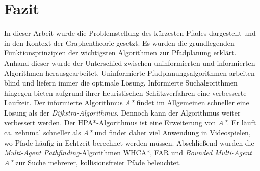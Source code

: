 \chapter{Fazit}

In dieser Arbeit wurde die Problemstellung des kürzesten Pfades dargestellt und in den Kontext der Graphentheorie gesetzt. Es wurden die grundlegenden Funktionsprinzipien der wichtigsten Algorithmen zur Pfadplanung erklärt. Anhand dieser wurde der Unterschied zwischen uninformierten und informierten Algorithmen herausgearbeitet. Uninformierte Pfadplanungsalgorithmen arbeiten blind und liefern immer die optimale Lösung. Informierte Suchalgorithmen hingegen bieten aufgrund ihrer heuristischen Schätzverfahren eine verbesserte Laufzeit. Der informierte Algorithmus \textit{A*} findet im Allgemeinen schneller eine Lösung als der \textit{Dijkstra-Algorithmus}. Dennoch kann der Algorithmus weiter verbessert werden. Der HPA*-Algorithmus ist eine Erweiterung von \textit{A*}. Er läuft ca. zehnmal schneller als \textit{A*} und findet daher viel Anwendung in Videospielen, wo Pfade häufig in Echtzeit berechnet werden müssen. Abschließend wurden die \textit{Multi-Agent Pathfinding}-Algorithmen WHCA*, FAR und \textit{Bounded Multi-Agent A*} zur Suche mehrerer, kollisionsfreier Pfade beleuchtet.




